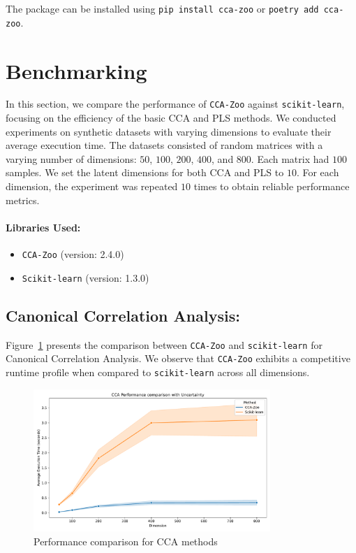 The package can be installed using \texttt{pip install cca-zoo} or \texttt{poetry add cca-zoo}.



\section{Benchmarking}

In this section, we compare the performance of \texttt{CCA-Zoo} against \texttt{scikit-learn}, focusing on the efficiency of the basic CCA and PLS methods.
We conducted experiments on synthetic datasets with varying dimensions to evaluate their average execution time.
The datasets consisted of random matrices with a varying number of dimensions: \(50\), \(100\), \(200\), \(400\), and \(800\). Each matrix had \(100\) samples. We set the latent dimensions for both CCA and PLS to \(10\). For each dimension, the experiment was repeated \(10\) times to obtain reliable performance metrics.

\paragraph{Libraries Used:}
\begin{itemize}
    \item \texttt{CCA-Zoo} (version: 2.4.0)
    \item \texttt{Scikit-learn} (version: 1.3.0)
\end{itemize}

\subsection{Canonical Correlation Analysis:}
Figure~\ref{fig:cca_benchmark} presents the comparison between \texttt{CCA-Zoo} and \texttt{scikit-learn} for Canonical Correlation Analysis. We observe that \texttt{CCA-Zoo} exhibits a competitive runtime profile when compared to \texttt{scikit-learn} across all dimensions.

\begin{figure}[h]
    \centering
    \includegraphics[width=0.8\textwidth]{figures/CCA_Speed_Benchmark}
    \caption{Performance comparison for CCA methods}
    \label{fig:cca_benchmark}
\end{figure}

